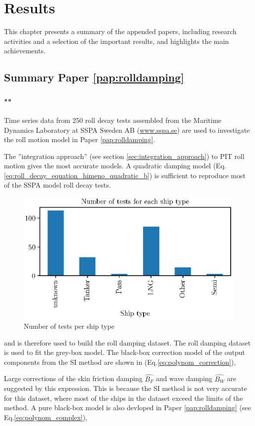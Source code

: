 \chapter{Results\label{ch:results}}
This chapter presents a summary of the appended papers, including research activities
and a selection of the important results, and highlights the main achievements.

\section{Summary Paper \ref{pap:rolldamping}}
\subsection*{""}
Time series data from 250 roll decay tests assembled from the Maritime Dynamics Laboratory at SSPA Sweden AB (\href{www.sspa.se}{www.sspa.se}) are used to investigate the roll motion model in Paper \ref{pap:rolldamping}. 


The ''integration approach'' (see section \ref{sec:integration_approach}) to PIT roll motion gives the most accurate models.
A quadratic damping model (Eq.\ref{eq:roll_decay_equation_himeno_quadratic_b}) is sufficient to reproduce most of the SSPA model roll decay tests.

\begin{figure}[H]
    \centering
    \includegraphics[width=0.5\columnwidth]{kappa/images/ship_types.eps}
    \caption{Number of tests per ship type}
    \label{fig:ship_types}
\end{figure}

and is therefore used to build the roll damping dataset. 
The roll damping dataset is used to fit the grey-box model. The black-box correction model of the output components from the SI method are shown in (Eq.\ref{eq:polynom_correction}),


\noindent Large corrections of the skin friction damping $\hat{B_F}$ and wave damping $\hat{B_W}$ are suggested by this expression. This is because the SI method is not very accurate for this dataset, where most of the ships in the dataset exceed the limits of the method. A pure black-box model is also devloped in Paper \ref{pap:rolldamping} (see Eq.\ref{eq:polynom_complex}),


